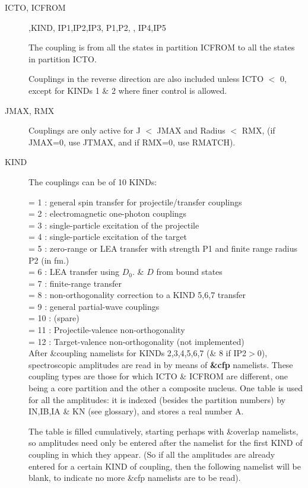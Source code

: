 \documentclass[11pt]{article}
\begin{document}
\begin{description}
\item[ICTO, ICFROM] ,KIND,  IP1,IP2,IP3,  P1,P2,  , IP4,IP5

The coupling is from all the states in partition ICFROM
to all the states in partition ICTO.

Couplings in the reverse direction are also included unless
ICTO $<$ 0, except for KINDs 1 \& 2 where finer control is allowed.

\item[JMAX, RMX]
Couplings are only active for J $<$ JMAX and Radius $<$ RMX,
(if JMAX=0, use JTMAX, and if RMX=0, use  RMATCH).

\item[KIND]
The couplings can be of 10 KINDs:

            = 1 : general spin transfer for projectile/transfer couplings\\
            = 2 : electromagnetic one-photon couplings\\
            = 3 : single-particle excitation of the projectile\\
            = 4 : single-particle excitation of the target\\
            = 5 : zero-range or LEA transfer with strength P1 and finite range radius P2 (in fm.)\\
            = 6 : LEA transfer using $D_0$. \& $D$ from bound states\\
            = 7 : finite-range transfer\\
            = 8 : non-orthogonality correction to a KIND 5,6,7 transfer\\
            = 9 : general partial-wave couplings\\
            = 10 : (spare)\\
            = 11 : Projectile-valence non-orthogonality\\
            = 12 : Target-valence non-orthogonality (not implemented)\\

After \&coupling namelists for KINDs 2,3,4,5,6,7 (\& 8 if IP2$>$0),
spectroscopic amplitudes are read in by means of {\bf \&cfp} namelists.
These coupling types are those for which ICTO \& ICFROM are
different, one being a core partition and the other a composite
nucleus. One table is used for all the amplitudes: it is indexed
(besides the partition numbers) by IN,IB,IA \& KN (see glossary),
and stores a real number A.

The table is filled cumulatively,
starting perhaps with \&overlap namelists, 
so amplitudes need only be
entered after the namelist for the first KIND of coupling in which
they appear.
(So if all the amplitudes are already entered for a certain KIND
of coupling, then the following namelist will be blank, to indicate
no more \&cfp namelists are to be read).


\end{description}
\end{document}
